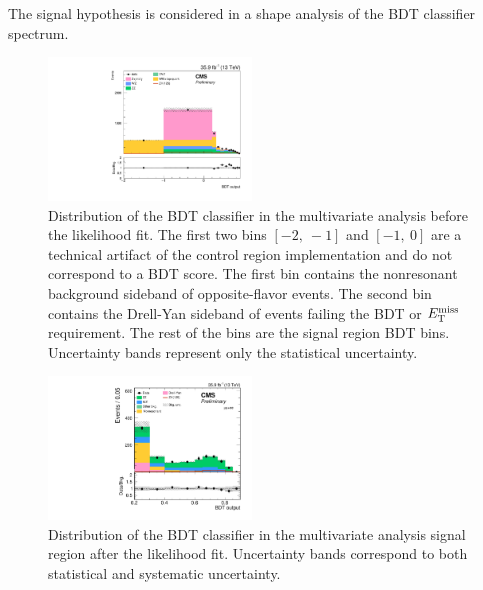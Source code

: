 The signal hypothesis is considered in a shape analysis of the BDT classifier spectrum. 

\begin{figure}[htbp]
\begin{center}
\includegraphics[width=0.48\textwidth]{figures/bdt_zh_prefit.pdf}
\caption{Distribution of the BDT classifier in the multivariate analysis before the likelihood fit.
The first two bins $[-2,\ -1]$ and $[-1,\ 0]$ are a technical artifact of the control region implementation and do not correspond to a BDT score.
The first bin contains the nonresonant background sideband of opposite-flavor events. The second bin contains the Drell-Yan sideband of events failing the BDT or $E_\mathrm{T}^{\mathrm{miss}}$ requirement. The rest of the bins are the signal region BDT bins. Uncertainty bands represent only the statistical uncertainty.}
\label{fig:bdt_zh_prefit}
\end{center}
\end{figure}

\begin{figure}[htbp]
\begin{center}
\includegraphics[width=0.48\textwidth]{figures/fullsel_bdt_ll_postfit.pdf}
\caption{Distribution of the BDT classifier in the multivariate analysis signal region after the likelihood fit. Uncertainty bands correspond to both statistical and systematic uncertainty.}
\label{fig:bdt_zh}
\end{center}
\end{figure}

